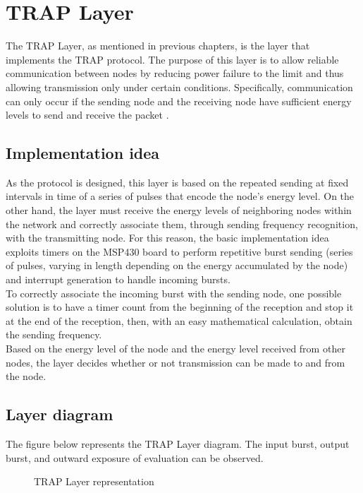 \chapter{TRAP Layer}
\label{cha:TRAP Layer}
The TRAP Layer, as mentioned in previous chapters, is the layer that implements the TRAP protocol. The purpose of this layer is to allow reliable communication between nodes by reducing power failure to the limit and thus allowing transmission only under certain conditions. Specifically, communication can only occur if the sending node and the receiving node have sufficient energy levels to send and receive the packet \cite{9733918}.\\

\section{Implementation idea}
\label{sec:Implementation idea}
As the protocol is designed, this layer is based on the repeated sending at fixed intervals in time of a series of pulses that encode the node's energy level. On the other hand, the layer must receive the energy levels of neighboring nodes within the network and correctly associate them, through sending frequency recognition, with the transmitting node. For this reason, the basic implementation idea exploits timers on the MSP430 board to perform repetitive burst sending (series of pulses, varying in length depending on the energy accumulated by the node) and interrupt generation to handle incoming bursts.\\
To correctly associate the incoming burst with the sending node, one possible solution is to have a timer count from the beginning of the reception and stop it at the end of the reception, then, with an easy mathematical calculation, obtain the sending frequency.\\
Based on the energy level of the node and the energy level received from other nodes, the layer decides whether or not transmission can be made to and from the node.

\section{Layer diagram}
\label{sec:Layer diagram}
The figure below represents the TRAP Layer diagram. The input burst, output burst, and outward exposure of evaluation can be observed.\\
  \begin{figure}[h!]
    \centerline{}
    \caption{\footnotesize \centering TRAP Layer representation}
    \label{fig:TRAPLayerDiagram}
  \end{figure}
 
